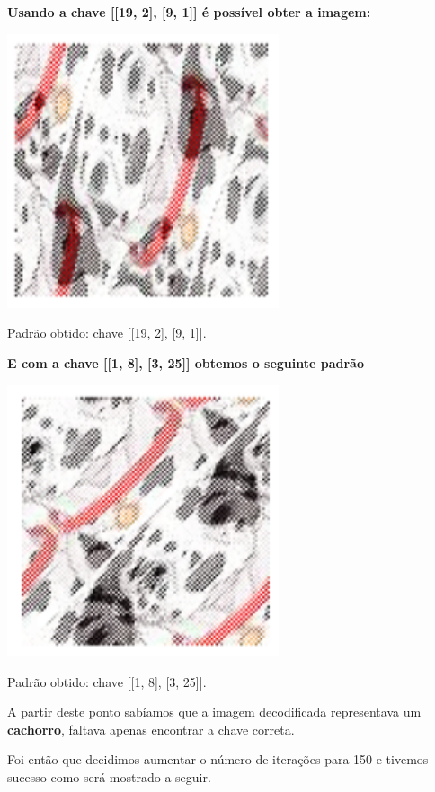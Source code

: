 \documentclass[a4paper, 12pt]{article}
\begin{document}
\textbf{Usando a chave [[19, 2], [9, 1]] é possível obter a imagem:}

\begin{center}
    \includegraphics[width=8cm]{244.PNG}
    
    Padrão obtido: chave [[19, 2], [9, 1]].
\end{center}

\textbf{E com a chave [[1, 8], [3, 25]] obtemos o seguinte padrão}

\begin{center}
    \includegraphics[width=8cm]{330.PNG}
    
    Padrão obtido: chave [[1, 8], [3, 25]].
\end{center}

A partir deste ponto sabíamos que a imagem decodificada representava um \textbf{cachorro}, faltava apenas encontrar a chave correta.

Foi então que decidimos aumentar o número de iterações para 150 e tivemos sucesso como será mostrado a seguir.
\end{document}
